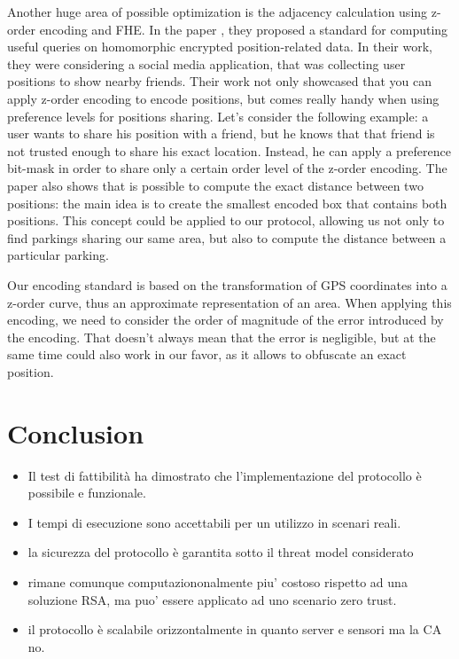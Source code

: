 Another huge area of possible optimization is the adjacency calculation using z-order encoding and FHE. In the paper \cite{zhang2020privacy}, they proposed a standard for computing useful queries on homomorphic encrypted position-related data. In their work, they were considering a social media application, that was collecting user positions to show nearby friends. Their work not only showcased that you can apply z-order encoding to encode positions, but comes really handy when using preference levels for positions sharing. Let's consider the following example: a user wants to share his position with a friend, but he knows that that friend is not trusted enough to share his exact location. Instead, he can apply a preference bit-mask in order to share only a certain order level of the z-order encoding. The paper also shows that is possible to compute the exact distance between two positions: the main idea is to create the smallest encoded box that contains both positions. This concept could be applied to our protocol, allowing us not only to find parkings sharing our same area, but also to compute the distance between a particular parking.


Our encoding standard is based on the transformation of GPS coordinates into a z-order curve, thus an approximate representation of an area. When applying this encoding, we need to consider the order of magnitude of the error introduced by the encoding. That doesn't always mean that the error is negligible, but at the same time could also work in our favor, as it allows to obfuscate an exact position.

\section{Conclusion}

\begin{itemize}
    \item Il test di fattibilità ha dimostrato che l'implementazione del protocollo è possibile e funzionale.
    \item I tempi di esecuzione sono accettabili per un utilizzo in scenari reali.
    \item la sicurezza del protocollo è garantita sotto il threat model considerato
    \item rimane comunque computaziononalmente piu' costoso rispetto ad una soluzione RSA, ma puo' essere applicato ad uno scenario zero trust.
    \item il protocollo è scalabile orizzontalmente in quanto server e sensori ma la CA no.
\end{itemize}
